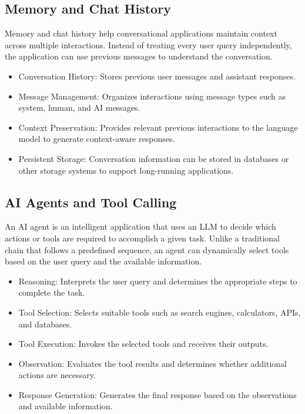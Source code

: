 \subsection{Memory and Chat History}

Memory and chat history help conversational applications maintain context across multiple interactions. Instead of treating every user query independently, the application can use previous messages to understand the conversation.

\begin{itemize}
    \item Conversation History: Stores previous user messages and assistant responses.
    
    \item Message Management: Organizes interactions using message types such as system, human, and AI messages.
    
    \item Context Preservation: Provides relevant previous interactions to the language model to generate context-aware responses.
    
    \item Persistent Storage: Conversation information can be stored in databases or other storage systems to support long-running applications.
\end{itemize}

\subsection{AI Agents and Tool Calling}

An AI agent is an intelligent application that uses an LLM to decide which actions or tools are required to accomplish a given task. Unlike a traditional chain that follows a predefined sequence, an agent can dynamically select tools based on the user query and the available information.

\begin{itemize}
    \item Reasoning: Interprets the user query and determines the appropriate steps to complete the task.
    
    \item Tool Selection: Selects suitable tools such as search engines, calculators, APIs, and databases.
    
    \item Tool Execution: Invokes the selected tools and receives their outputs.
    
    \item Observation: Evaluates the tool results and determines whether additional actions are necessary.
    
    \item Response Generation: Generates the final response based on the observations and available information.
\end{itemize}

